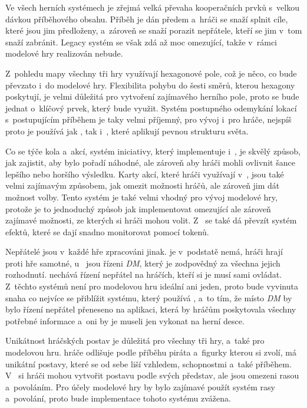 Ve všech herních systémech je zřejmá velká převaha kooperačních prvků s~velkou dávkou příběhového obsahu. Příběh je dán předem a~hráči se snaží splnit cíle, které jsou jim předloženy, a~zároveň se snaží porazit nepřátele, kteří se jim v~tom snaží zabránit. Legacy systém  se však zdá až moc omezující, takže v~rámci modelové hry realizován nebude.

Z~pohledu mapy všechny tři hry využívají hexagonové pole, což je něco, co bude převzato i~do modelové hry. Flexibilita pohybu do šesti směrů, kterou hexagony poskytují, je velmi důležitá pro vytvoření zajímavého herního pole, proto se bude jednat o~klíčový prvek, který bude využit. Systém postupného odemykání lokací s~postupujícím příběhem je taky velmi příjemný, pro vývoj i~pro hráče, nejspíš proto je používá jak , tak i~, které aplikují pevnou strukturu světa.

Co se týče kola a~akcí, systém iniciativy, který implementuje  i~\dnd{}, je skvělý způsob, jak zajistit, aby bylo pořadí náhodné, ale zároveň aby hráči mohli ovlivnit šance lepšího nebo horšího výsledku. Karty akcí, které hráči využívají v~, jsou také velmi zajímavým způsobem, jak omezit možnosti hráčů, ale zároveň jim dát možnost volby. Tento systém je také velmi vhodný pro vývoj modelové hry, protože je to jednoduchý způsob jak implementovat omezující ale zároveň zajímavé možnosti, ze kterých si hráči mohou volit. Z~ se také dá převzít systém efektů, které se dají snadno monitorovat pomocí tokenů.

Nepřátelé jsou v~každé hře zpracováni jinak.  je v~podstatě nemá, hráči hrají proti hře samotné, u~\dnd{} jsou řízeni \textit{DM}, který je zodpovědný za všechna jejich rozhodnutí.  nechává řízení nepřátel na hráčích, kteří si je musí sami ovládat. Z~těchto systémů není pro modelovou hru ideální ani jeden, proto bude vyvinuta snaha co nejvíce se přiblížit systému, který používá \dnd{}, a~to tím, že místo \textit{DM} by bylo řízení nepřátel přeneseno na aplikaci, která by hráčům poskytovala všechny potřebné informace a~oni by je museli jen vykonat na herní desce.

Unikátnost hráčských postav je důležitá pro všechny tři hry, a~také pro modelovou hru.  hráče odlišuje podle příběhu piráta a~figurky kterou si zvolí,  má unikátní postavy, které se od sebe liší vzhledem, schopnostmi a~také příběhem. V~\dnd{} si hráči mohou vytvořit postavu podle svých představ, ale jsou omezeni rasou a~povoláním. Pro účely modelové hry by bylo zajímavé použít systém rasy a~povolání, proto bude implementace tohoto systému zvážena.


